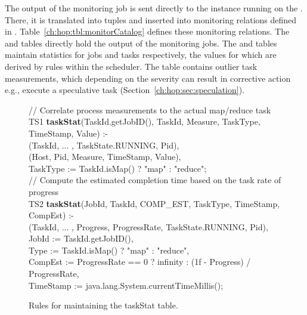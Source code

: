 The output of the monitoring job is sent directly to the \JOL instance running on the \JT. There, it is translated into \JOL
tuples and inserted into monitoring relations defined in \JOL. Table~\ref{ch:hop:tbl:monitorCatalog} defines these monitoring 
relations. The  and  tables directly hold the output of the monitoring jobs. The  
and  tables maintain statistics for jobs and tasks respectively, the values for which are derived by rules within the scheduler.  
The  table contains outlier task measurements, which depending on the severity can result in corrective action e.g., execute
a speculative task (Section~\ref{ch:hop:sec:speculation}). 

\begin{figure}
\ssp
\centering
\begin{boxedminipage}{\linewidth}
// Correlate process measurements to the actual map/reduce task \\
TS1 {\bf taskStat}(TaskId.getJobID(), TaskId, Measure, TaskType, TimeStamp, Value) :- \\
(TaskId, ... , TaskState.RUNNING, Pid), \\
(Host, Pid, Measure, TimeStamp, Value), \\
\datalogspace TaskType := TaskId.isMap() ? "map" : "reduce"; \\
        
// Compute the estimated completion time based on the task rate of progress \\
TS2 {\bf taskStat}(JobId, TaskId, COMP\_EST, TaskType, TimeStamp, CompEst) :- \\
(TaskId, ... , Progress, ProgressRate, TaskState.RUNNING, Pid), \\
\datalogspace JobId := TaskId.getJobID(), \\
\datalogspace Type := TaskId.isMap() ? "map" : "reduce", \\
\datalogspace CompEst := ProgressRate == 0 ? infinity : (1f - Progress) / ProgressRate, \\
\datalogspace TimeStamp := java.lang.System.currentTimeMillis(); \\
\end{boxedminipage}
\caption{\label{ch:hop:fig:taskstat} Rules for maintaining the taskStat table.}
\end{figure}

